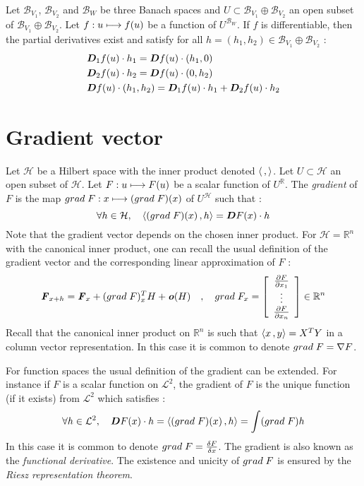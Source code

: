 Let $\mathcal{B}_{V_1}$, $\mathcal{B}_{V_2}$ and $\mathcal{B}_W$ be three Banach spaces and $U \subset \mathcal{B}_{V_1}\oplus\mathcal{B}_{V_2}$ an open subset of $\mathcal{B}_{V_1}\oplus\mathcal{B}_{V_2}$.
Let $f : u \longmapsto f(u)$ be a function of  $U^{\mathcal{B}_W}$.
If $f$ is differentiable, then the partial derivatives exist and satisfy for all $h = (h_1,h_2) \in \mathcal{B}_{V_1}\oplus\mathcal{B}_{V_2}$ :
\begin{align}
	&\boldsymbol{D}_1f(u)\cdot h_1 = \boldsymbol{D}f(u)\cdot(h_1,0) \\
	&\boldsymbol{D}_2f(u)\cdot h_2 = \boldsymbol{D}f(u)\cdot(0,h_2) \\
	&\boldsymbol{D}f(u)\cdot(h_1,h_2) = \boldsymbol{D}_1f(u)\cdot h_1 + \boldsymbol{D}_2f(u)\cdot h_2
\end{align}

\section{Gradient vector}

Let $\mathcal{H}$ be a Hilbert space with the inner product denoted $\langle \,, \rangle$. Let $U \subset \mathcal{H}$ an open subset of $\mathcal{H}$.
Let $F : u \longmapsto F(u)$ be a scalar function of  $U^{\mathbb{R}}$.
The \emph{gradient} of $F$ is the map $grad\;F : x \longmapsto (grad\;F)(x)$ of $U^{\mathcal{H}}$ such that :
\begin{equation}
	\forall h \in \mathcal{H}, \quad  \langle (grad\;F)(x)\,, h\rangle = \boldsymbol{D}F(x)\cdot h
\end{equation}
Note that the gradient vector depends on the chosen inner product.
For $\mathcal{H} = \mathbb{R}^{n}$ with the canonical inner product, one can recall the usual definition of the gradient vector and the corresponding linear approximation of $F$ :
\begin{equation}
	\boldsymbol{\mathit{F}}_{x+h} = \boldsymbol{\mathit{F}}_{x} + (grad\;F)_{x}^T H + \boldsymbol{\mathit{o}}(H)
	\quad , \quad grad\;F_{x} = \left[\begin{array}{c}\frac{\partial F}{\partial x_1} \\ \vdots \\ \frac{\partial F}{\partial x_n}\end{array}\right] \in \mathbb{R}^n
\end{equation}
Recall that the canonical inner product on $\mathbb{R}^{n}$ is such that $\langle x\,, y\rangle = X^{T}Y$ in a column vector representation. In this case it is common to denote $grad\;F = \nabla{F}$.

For function spaces the usual definition of the gradient can be extended. For instance if $F$ is a scalar function on $\mathcal{L}^2$, the gradient of $F$ is the unique function (if it exists) from $\mathcal{L}^2$ which satisfies :
\begin{equation}
	\forall h \in \mathcal{L}^2, \quad \boldsymbol{D}F(x)\cdot h = \langle (grad\;F)(x)\,, h\rangle = \int (grad\;F)h
\end{equation}
In this case it is common to denote $grad\;F = \frac{\delta F}{\delta x}$. The gradient is also known as the \emph{functional derivative}. The existence and unicity of $grad\;F$ is ensured by the \emph{Riesz representation theorem}.

